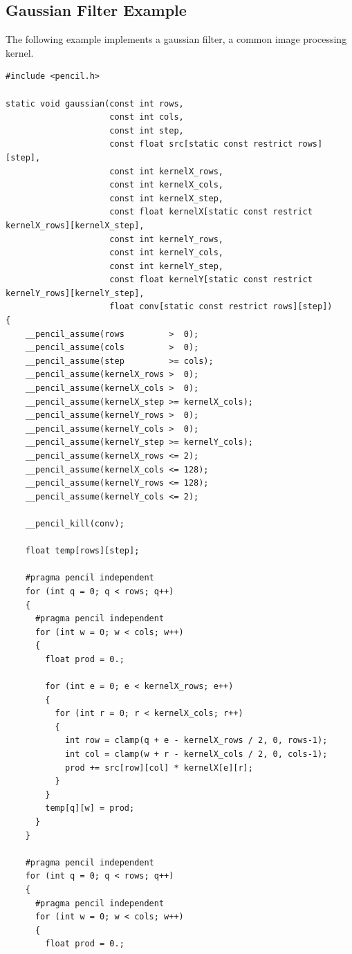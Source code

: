 \documentclass{carp}
\begin{document}
\subsection{Gaussian Filter Example}

The following example implements a gaussian filter,
a common image processing kernel.

\begin{lstlisting}[language=pencil,escapechar=@]
#include <pencil.h>

static void gaussian(const int rows,
                     const int cols,
                     const int step,
                     const float src[static const restrict rows][step],
                     const int kernelX_rows,
                     const int kernelX_cols,
                     const int kernelX_step,
                     const float kernelX[static const restrict kernelX_rows][kernelX_step],
                     const int kernelY_rows,
                     const int kernelY_cols,
                     const int kernelY_step,
                     const float kernelY[static const restrict kernelY_rows][kernelY_step],
                     float conv[static const restrict rows][step])
{
    __pencil_assume(rows         >  0);
    __pencil_assume(cols         >  0);
    __pencil_assume(step         >= cols);
    __pencil_assume(kernelX_rows >  0);
    __pencil_assume(kernelX_cols >  0);
    __pencil_assume(kernelX_step >= kernelX_cols);
    __pencil_assume(kernelY_rows >  0);
    __pencil_assume(kernelY_cols >  0);
    __pencil_assume(kernelY_step >= kernelY_cols);
    __pencil_assume(kernelX_rows <= 2);
    __pencil_assume(kernelX_cols <= 128);
    __pencil_assume(kernelY_rows <= 128);
    __pencil_assume(kernelY_cols <= 2);

    __pencil_kill(conv);

    float temp[rows][step];

    #pragma pencil independent
    for (int q = 0; q < rows; q++)
    {
      #pragma pencil independent
      for (int w = 0; w < cols; w++)
      {
        float prod = 0.;

        for (int e = 0; e < kernelX_rows; e++)
        {
          for (int r = 0; r < kernelX_cols; r++)
          {
            int row = clamp(q + e - kernelX_rows / 2, 0, rows-1);
            int col = clamp(w + r - kernelX_cols / 2, 0, cols-1);
            prod += src[row][col] * kernelX[e][r];
          }
        }
        temp[q][w] = prod;
      }
    }
    
    #pragma pencil independent
    for (int q = 0; q < rows; q++)
    {
      #pragma pencil independent
      for (int w = 0; w < cols; w++)
      {
        float prod = 0.;


\end{lstlisting}
\end{document}

